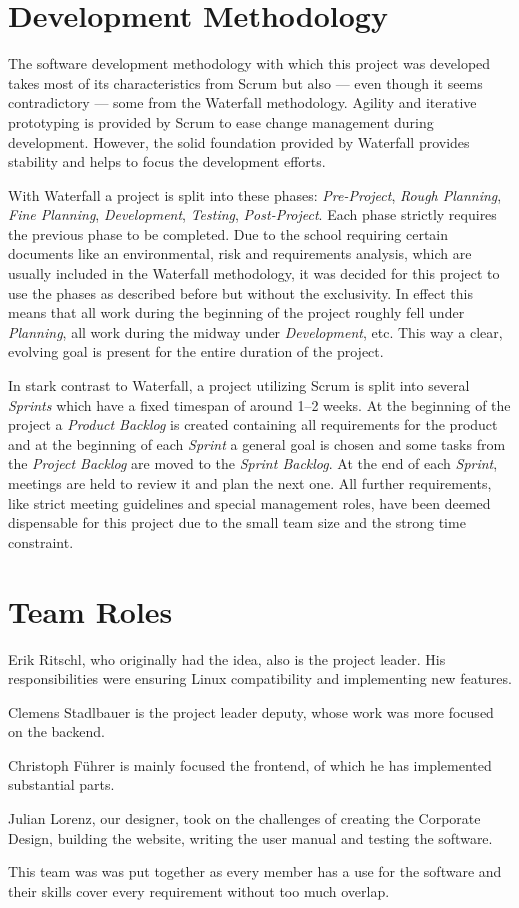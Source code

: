 \section{Development Methodology}
\def\kapitelautor{Clemens Stadlbauer}

The software development methodology with which this project was developed takes
most of its characteristics from Scrum but also --- even though it seems
contradictory --- some from the Waterfall methodology. Agility and iterative
prototyping is provided by Scrum to ease change management during development.
However, the solid foundation provided by Waterfall provides stability and
helps to focus the development efforts.

With Waterfall a project is split into these phases: \emph{Pre-Project},
\emph{Rough Planning}, \emph{Fine Planning}, \emph{Development},
\emph{Testing}, \emph{Post-Project}. Each phase strictly requires the previous
phase to be completed.
Due to the school requiring certain documents like an environmental, risk and
requirements analysis, which are usually included in the Waterfall methodology,
it was decided for this project to use the phases as described before but
without the exclusivity. In effect this means that all work during the
beginning of the project roughly fell under \emph{Planning}, all work during
the midway under \emph{Development}, etc. This way a clear, evolving goal is
present for the entire duration of the project.

In stark contrast to Waterfall, a project utilizing Scrum is split into several
\emph{Sprints} which have a fixed timespan of around 1--2
weeks. At the beginning of the project a \emph{Product Backlog} is created
containing all requirements for the product and at the beginning of each
\emph{Sprint} a general goal is chosen and some tasks from the \emph{Project
Backlog} are moved to the \emph{Sprint Backlog}. At the end of each
\emph{Sprint}, meetings are held to review it and plan the next one.  All
further requirements, like strict meeting guidelines and special management
roles, have been deemed dispensable for this project due to the small team size and
the strong time constraint.

\section{Team Roles}
\def\kapitelautor{Clemens Stadlbauer}

Erik Ritschl, who originally had the idea, %
also is the project leader. His responsibilities were ensuring Linux
compatibility and implementing new features.

Clemens Stadlbauer is the project leader deputy, whose work was more focused on
the backend.

Christoph Führer is mainly focused the frontend, of which he has implemented
substantial parts.

Julian Lorenz, our designer, took on the challenges of creating the Corporate
Design, building the website, writing the user manual and testing the software.

This team was was put together as every member has a use for the software and their skills
cover every requirement without too much overlap.
